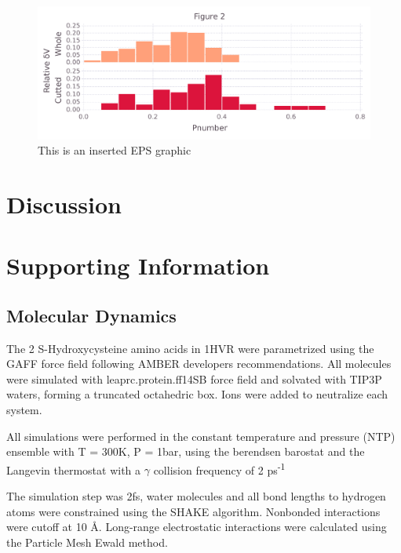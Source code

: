\documentclass[10pt,letterpaper]{article}
\begin{document}
\begin{figure}[ht]
\begin{center}
\includegraphics[scale=0.5]{256l/3both_figure_very_hi-precision.pdf}
\caption{This is an inserted EPS graphic}
\label{fig13}
\end{center}
\end{figure}

\FloatBarrier
\newpage



\section{Discussion}

\newpage
\section{Supporting Information}
\subsection{Molecular Dynamics}
\label{Molecular Dynamics}
The 2 S-Hydroxycysteine amino acids in 1HVR were parametrized using the GAFF force field following AMBER developers recommendations. All molecules were simulated with leaprc.protein.ff14SB force field and solvated with TIP3P waters, forming a truncated octahedric box. Ions were added to neutralize each system.

All simulations were performed in the constant temperature and pressure (NTP) ensemble with T = 300K, P = 1bar, using the berendsen barostat and the Langevin thermostat with a \textbf{$\gamma$} collision frequency of 2 ps\textsuperscript{-1}

The simulation step was 2fs, water molecules and all bond lengths to hydrogen atoms were constrained using the SHAKE algorithm. Nonbonded interactions were cutoff at 10 \AA . Long-range electrostatic interactions were calculated using the Particle Mesh Ewald method.
\end{document}
